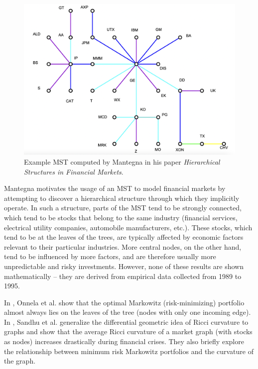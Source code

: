 \documentclass[12pt]{article}
\theoremstyle{definition}
\begin{document}
\begin{figure}[hbt!]
    \vspace{0.1in}
    \par
    \begin{center}
    \caption{Example MST computed by Mantegna in his paper \textit{Hierarchical Structures in Financial Markets}.}
    \label{fig:ExampleMST}
    \includegraphics[scale=0.50]{Figures/StockMST.png}
    \end{center}
    \par
    \medskip
\end{figure}

Mantegna motivates the usage of an MST to model financial markets by attempting to discover a hierarchical structure through which they implicitly operate. In such a structure, parts of the MST tend to be strongly connected, which tend to be stocks that belong to the same industry (financial services, electrical utility companies, automobile manufacturers, etc.). These stocks, which tend to be at the leaves of the trees, are typically affected by economic factors relevant to their particular industries. More central nodes, on the other hand, tend to be influenced by more factors, and are therefore usually more unpredictable and risky investments. However, none of these results are shown mathematically -- they are derived from empirical data collected from 1989 to 1995.

In \cite{dynamicsMarketCorrelations}, Onnela et al. show that the optimal Markowitz (risk-minimizing) portfolio almost always lies on the leaves of the tree (nodes with only one incoming edge). In \cite{sandhu2015market}, Sandhu et al. generalize the differential geometric idea of Ricci curvature to graphs and show that the average Ricci curvature of a market graph (with stocks as nodes) increases drastically during financial crises. They also briefly explore the relationship between minimum risk Markowitz portfolios and the curvature of the graph.
\end{document}
